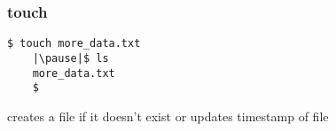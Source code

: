\documentclass[%
        hyperref={%
                pdfauthor={Zakariyya Mughal},%
                pdfpagemode={None},pdfpagelayout={SinglePage}}%
        xcolor={x11names},%
]{beamer}
\begin{document}
\begin{frame}[fragile]
	\frametitle{touch}
	\begin{lstlisting}[escapeinside=||]
	$ touch more_data.txt
	|\pause|$ ls
	more_data.txt
	$
	\end{lstlisting}

	creates a file if it doesn't exist or updates timestamp of
	file
\end{frame}
\end{document}
